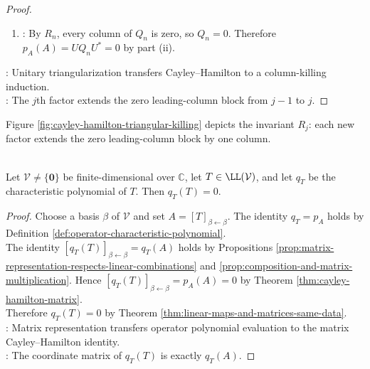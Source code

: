 \begin{theorem}
\begin{proof}
\begin{enumerate}[label=(\roman*)]
Hence $(\forall\,j\in\{1,\ldots,n\})\,R_j$ by Theorem \ref{thm:mathematical-induction}.
\item {}: By $R_n$, every column of $Q_n$ is zero, so $Q_n=0$. Therefore $p_A(A)=UQ_nU^*=0$ by part (ii).
\end{enumerate}
: Unitary triangularization transfers Cayley--Hamilton to a column-killing induction.\\
: The $j$th factor extends the zero leading-column block from $j-1$ to $j$.
\end{proof}
\end{theorem}

Figure \ref{fig:cayley-hamilton-triangular-killing} depicts the invariant $R_j$: each new factor extends the zero leading-column block by one column.

\begin{illustrationfigure}[H]
  \centering
  
  \caption{For upper-triangular $T$, the factors $T-\lambda_iI_n$ make the first $j$ columns of $Q_j$ vanish successively.}
  \label{fig:cayley-hamilton-triangular-killing}
\end{illustrationfigure}

\begin{theorem} \label{thm:cayley-hamilton-operator} \\
Let $\mathcal{V}\neq\{\mathbf{0}\}$ be finite-dimensional over $\mathbb{C}$, let $T\in\LL(\mathcal{V})$, and let $q_T$ be the characteristic polynomial of $T$. Then $q_T(T)=0$.
\begin{proof}
Choose a basis $\beta$ of $\mathcal{V}$ and set $A=[T]_{\beta\leftarrow\beta}$. The identity $q_T=p_A$ holds by Definition \ref{def:operator-characteristic-polynomial}.\\
The identity $[q_T(T)]_{\beta\leftarrow\beta}=q_T(A)$ holds by Propositions \ref{prop:matrix-representation-respects-linear-combinations} and \ref{prop:composition-and-matrix-multiplication}. Hence $[q_T(T)]_{\beta\leftarrow\beta}=p_A(A)=0$ by Theorem \ref{thm:cayley-hamilton-matrix}.\\
Therefore $q_T(T)=0$ by Theorem \ref{thm:linear-maps-and-matrices-same-data}.\\
: Matrix representation transfers operator polynomial evaluation to the matrix Cayley--Hamilton identity.\\
: The coordinate matrix of $q_T(T)$ is exactly $q_T(A)$.
\end{proof}
\end{theorem}

